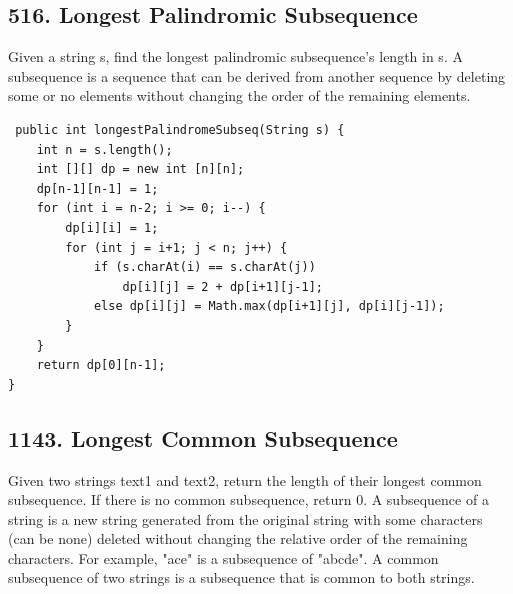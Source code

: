 \documentclass[9pt, b5paper]{article}
\begin{document}
\subsection{516. Longest Palindromic Subsequence}
\label{sec-4-16}
Given a string s, find the longest palindromic subsequence's length in s.
A subsequence is a sequence that can be derived from another sequence by deleting some or no elements without changing the order of the remaining elements.
\begin{verbatim}
 public int longestPalindromeSubseq(String s) {
    int n = s.length();
    int [][] dp = new int [n][n];
    dp[n-1][n-1] = 1;
    for (int i = n-2; i >= 0; i--) {
        dp[i][i] = 1;
        for (int j = i+1; j < n; j++) {
            if (s.charAt(i) == s.charAt(j))
                dp[i][j] = 2 + dp[i+1][j-1];
            else dp[i][j] = Math.max(dp[i+1][j], dp[i][j-1]);
        }
    }
    return dp[0][n-1];
}
\end{verbatim}

\subsection{1143. Longest Common Subsequence}
\label{sec-4-17}
Given two strings text1 and text2, return the length of their longest common subsequence. If there is no common subsequence, return 0.
A subsequence of a string is a new string generated from the original string with some characters (can be none) deleted without changing the relative order of the remaining characters.
For example, "ace" is a subsequence of "abcde".
A common subsequence of two strings is a subsequence that is common to both strings.
\end{document}
